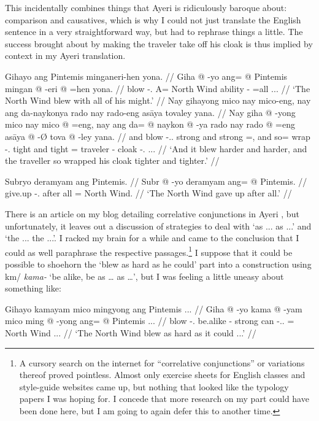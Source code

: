 \documentclass[12pt,paper=a4]{scrartcl}
\newcommand{\ques}{\fakesuperscript{?}} %
\newcommand{\xayr}[3]{{\Tagati #1} \emph{#2} \enquote*{#3}}
\begin{document}
This incidentally combines things that Ayeri is ridiculously baroque about: comparison and causatives, which is why I could not just translate the English sentence in a very straightforward way, but had to rephrase things a little. The success brought about by making the traveler take off his cloak is thus implied by context in my Ayeri translation.

\pex %
\a \begingl
	\glpreamble Gihayo ang Pintemis minganeri-hen yona. //
	\gla Giha @ -yo ang= @ Pintemis mingan @ -eri @ =hen yona. //
	\glb blow -\Tsg{}.\N{} A= {North Wind} ability -\Ins{} =all \Tsg{}.\N{}.\Gen{}. //
	\glft `The North Wind blew with all of his might.' //
\endgl
\a \begingl
	\glpreamble Nay gihayong mico nay mico-eng, nay ang da-naykonya rado nay rado-eng asāya tovaley yana. //
	\gla Nay giha @ -yong mico nay mico @ =eng, nay ang da= @ naykon @ -ya rado nay rado @ =eng asāya @ -Ø tova @ -ley yana. //
	\glb and blow -\Tsg.\N{}.\Aarg{} strong and strong =\Comp{}, and \AgtT{} so= wrap -\Tsg{}.\M{} tight and tight =\Comp{} traveler -\Top{} cloak -\Parg{}.\Inan{} \Tsg{}.\M{}.\Gen{}. //
	\glft `And it blew harder and harder, and the traveller so wrapped his cloak tighter and tighter.' //
\endgl

\a \begingl
	\glpreamble Subryo deramyam ang Pintemis. //
	\gla Subr @ -yo deramyam ang= @ Pintemis. //
	\glb give.up -\Tsg{}.\N{} {after all} \Aarg{}= {North Wind}. //
	\glft `The North Wind gave up after all.' //
\endgl
\xe

There is an article on my blog detailing correlative conjunctions in Ayeri \autocite{becker2012}, but unfortunately, it leaves out a discussion of strategies to deal with `as ... as ...' and `the ... the ...'. I racked my brain for a while and came to the conclusion that I could as well paraphrase the respective passages.\footnote{A cursory search on the internet for \enquote{correlative conjunctions} or variations thereof proved pointless. Almost only exercise sheets for English classes and style-guide websites came up, but nothing that looked like the typology papers I was hoping for. I concede that more research on my part could have been done here, but I am going to again defer this to another time.} I suppose that it could be possible to shoehorn the `blew as hard as he could' part into a construction using \xayr{km/}{kama-}{be alike, be as … as …}, but I was feeling a little uneasy about something like:

\ex[exno=iii]
\begingl
	\glpreamble \judge\ques{}Gihayo kamayam mico mingyong ang Pintemis ... //
	\gla Giha @ -yo kama @ -yam mico ming @ -yong ang= @ Pintemis ... //
	\glb blow -\Tsg{}.\N{} be.alike -\Ptcp{} strong can -\Tsg{}.\N{}.\Aarg{} \Aarg{}= {North Wind} ... //
	\glft `The North Wind blew as hard as it could ...' //
\endgl
\xe
\end{document}
